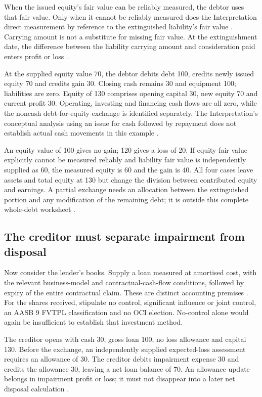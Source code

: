 When the issued equity's fair value can be reliably measured, the debtor uses
that fair value. Only when it cannot be reliably measured does the Interpretation
direct measurement by reference to the extinguished liability's fair value
\citep[paras.~6--7]{aasbint19exchange2020}. Carrying amount is not a substitute
for missing fair value. At the extinguishment date, the difference between the
liability carrying amount and consideration paid enters profit or loss
\citep[paras.~5, 9]{aasbint19exchange2020}.

At the supplied equity value 70, the debtor debits debt 100, credits newly
issued equity 70 and credits gain 30. Closing cash remains 30 and equipment
100; liabilities are zero. Equity of 130 comprises opening capital 30,
new equity 70 and current profit 30. Operating, investing and financing cash
flows are all zero, while the noncash debt-for-equity exchange is identified
separately. The Interpretation's conceptual analysis using an issue for cash
followed by repayment does not establish actual cash movements in this example
\citep[BC13, BC25]{aasbint19exchange2020}.

An equity value of 100 gives no gain; 120 gives a loss of 20. If equity fair
value explicitly cannot be measured reliably and liability fair value is
independently supplied as 60, the measured equity is 60 and the gain is 40.
All four cases leave assets and total equity at 130 but change the division
between contributed equity and earnings. A partial exchange needs an allocation
between the extinguished portion and any modification of the remaining debt;
it is outside this complete whole-debt worksheet
\citep[paras.~8, 10--11]{aasbint19exchange2020}.

\subsection{The creditor must separate impairment from disposal}

Now consider the lender's books. Supply a loan measured at amortised cost,
with the relevant business-model and contractual-cash-flow conditions, followed
by expiry of the entire contractual claim. These are distinct accounting
premises \citep[paras.~3.2.3, 4.1.2]{aasb9scope2026}. For the shares received,
stipulate no control, significant influence or joint control, an AASB 9 FVTPL
classification and no OCI election. No-control alone would again be insufficient
to establish that investment method.

The creditor opens with cash 30, gross loan 100, no loss allowance and capital
130. Before the exchange, an independently supplied expected-loss assessment
requires an allowance of 30. The creditor debits impairment expense 30 and
credits the allowance 30, leaving a net loan balance of 70. An allowance update
belongs in impairment profit or loss; it must not disappear into a later net
disposal calculation \citep[paras.~5.2.2, 5.5.8]{aasb9scope2026}.

